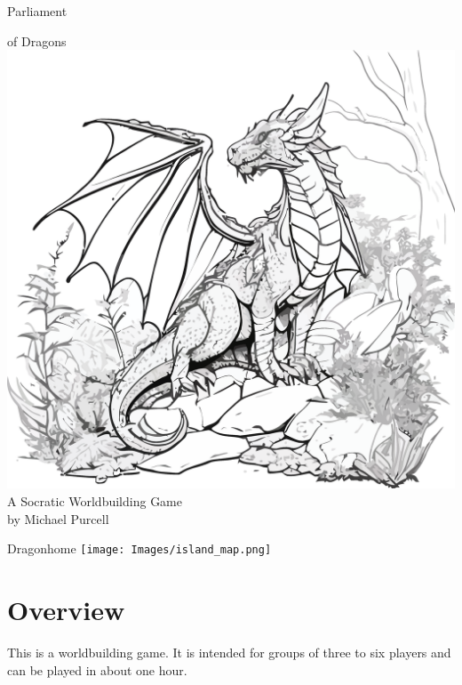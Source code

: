 \documentclass[a6paper, 11pt, parskip=half, DIV=15]{scrartcl}
\begin{document}
\begin{titlepage}
\enlargethispage{3.0\baselineskip}
\setmainfont[Scale=1.65]{DarkCrystal-Regular}
\Huge
\begin{center}
\vspace*{-0.5\baselineskip}
Parliament

of Dragons
\vfill
\includegraphics[scale=0.075]{Images/dragon_on_rocks.png}
\vfill
\huge
\setmainfont{Tex Gyre Chorus}
A Socratic Worldbuilding Game\\
\setmainfont{Tex Gyre Chorus}
by Michael Purcell
\end{center}
\end{titlepage}
\thispagestyle{empty}
\enlargethispage{1.75\baselineskip}
\setmainfont[Scale=2.0]{Tex Gyre Chorus}
\Huge
\begin{center}
Dragonhome
\smallskip
\vfill
\texttt{[image: Images/island\_map.png]}
\end{center}
\setmainfont[Scale=1.0]{URW Classico}
\normalsize

\newpage
\enlargethispage{3.5\baselineskip}

\section*{Overview}
This is a worldbuilding game. It is intended for groups of three to six players and can be played in about one hour.
\end{document}
